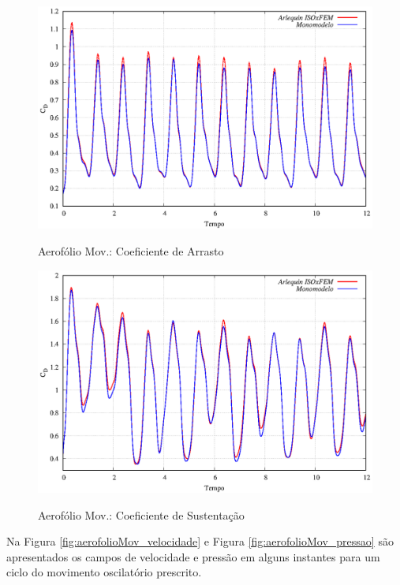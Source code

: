 \begin{figure}[!htbp]
	\caption{Aerofólio Mov.: Coeficiente de Arrasto}
	\centering 
	\includegraphics[scale=0.8,trim=0cm 0cm 0cm 0cm, clip=true]{Imagens/Cap6/aerofolioMov_CD.eps}	
	\label{fig:aerofolioMov_CD}
\end{figure}

\begin{figure}[!htbp]
	\caption{Aerofólio Mov.: Coeficiente de Sustentação}
	\centering 
	\includegraphics[scale=0.8,trim=0cm 0cm 0cm 0cm, clip=true]{Imagens/Cap6/aerofolioMov_CL.eps}	
	\label{fig:aerofolioMov_CL}
\end{figure}

Na Figura \ref{fig:aerofolioMov_velocidade} e Figura \ref{fig:aerofolioMov_pressao} são apresentados os campos de velocidade e pressão em alguns instantes para um ciclo do movimento oscilatório prescrito.

